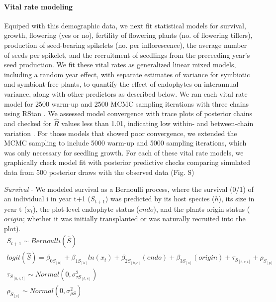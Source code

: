 \documentclass[12pt]{article}
\begin{document}
\paragraph*{Vital rate modeling}
Equiped with this demographic data, we next fit statistical models for survival, growth, flowering (yes or no), fertility of flowering plants (no. of flowering tillers),  production of seed-bearing spikelets (no. per inflorescence), the average number of seeds per spikelet, and the recruitment of seedlings from the preceeding year's seed production.  
We fit these vital rates as generalized linear mixed models, including a random year effect, with separate estimates of variance for symbiotic and symbiont-free plants, to quantify the effect of endophytes on interannual variance, along with other predictors as described below.
We ran each vital rate model for 2500 warm-up and 2500 MCMC sampling iterations with three chains using RStan \cite{rstan2022}. 
We assessed model convergence with trace plots of posterior chains and checked for $\hat{R}$ values less than 1.01, indicating low within- and between-chain variation \cite{brooks1998general, gelman2006data}. 
For those models that showed poor convergence, we extended the MCMC sampling to include 5000 warm-up and 5000 sampling iterations, which was only necessary for seedling growth. 
For each of these vital rate models, we graphically check model fit with posterior predictive checks comparing simulated data from 500 posterior draws with the observed data (Fig. S)

\emph{Survival} - We modeled survival as a Bernoulli process, where the survival (0/1) of an individual i in year t+1 ($S_{t+1}$) was predicted by its host species ($h$), its size in year t ($x_t$), the plot-level endophyte status ($endo$), and the plants origin status ($origin$; whether it was initially transplanted or was naturally recruited into the plot).
\begin{subequations} 
	\label{eq:survival}
	\begin{align}
		S_{t+1} \sim Bernoulli(\hat{S}) \\
		logit(\hat{S}) =  \beta_{0S_{[h]}} + \beta_{1S_{[h]}}ln(x_t) + \beta_{2S_{[h,e]}}(endo) + \beta_{3S_{[o]}}(origin) + \tau_{S_{[h,e,t]}} + \rho_{S_{[p]}} \\
		\tau_{S_{[h,e,t]}} \sim Normal(0, \sigma^2_{\tau S_{[h,e]}})\\
		\rho_{S_{[p]}} \sim Normal(0, \sigma^2_{\rho S})
	\end{align}
\end{subequations}
\end{document}

